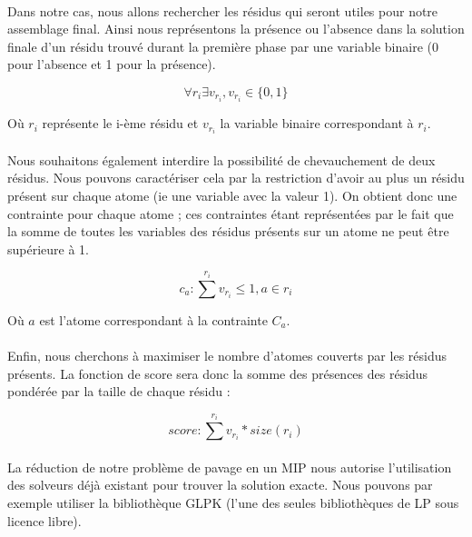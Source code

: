 \documentclass[12pt,french,twoside]{report}
\begin{document}
\paragraph{}Dans notre cas, nous allons rechercher les résidus qui seront utiles pour notre assemblage final.
Ainsi nous représentons la présence ou l'absence dans la solution finale d'un résidu trouvé durant la première phase par une
variable binaire (0 pour l'absence et 1 pour la présence).

\begin{equation}
 \forall r_i \exists v_{r_i}, v_{r_i} \in \{0, 1\}
\end{equation}

Où $r_i$ représente le i-ème résidu et $v_{r_i}$ la variable binaire correspondant à $r_i$.

\paragraph{}Nous souhaitons également interdire la possibilité de chevauchement de deux résidus. Nous pouvons caractériser cela
par la restriction d'avoir au plus un résidu présent sur chaque atome (ie une variable avec la valeur 1). On obtient donc une
contrainte pour chaque atome ; ces contraintes étant
représentées par le fait que la somme de toutes les variables des résidus présents sur un atome ne peut être supérieure à 1.

\begin{equation}
 c_a : \sum^{r_i} v_{r_i} \leqslant 1, a \in r_i
\end{equation}

Où $a$ est l'atome correspondant à la contrainte $C_a$.

\paragraph{}Enfin, nous cherchons à maximiser le nombre d'atomes couverts par les résidus présents. La fonction de score sera
donc la somme des présences des résidus pondérée par la taille de chaque résidu :

\begin{equation}
 score : \sum^{r_i} v_{r_i} * size(r_i)
\end{equation}

\paragraph{}La réduction de notre problème de pavage en un MIP nous autorise l'utilisation des solveurs déjà existant pour trouver la solution exacte.
Nous pouvons par exemple utiliser la bibliothèque GLPK (l'une des seules bibliothèques de LP sous licence libre).
\end{document}
